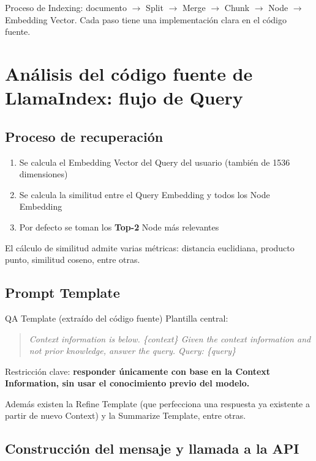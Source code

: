 \documentclass[a4paper]{article}
\begin{document}
Proceso de Indexing: documento $\rightarrow$ Split $\rightarrow$ Merge $\rightarrow$ Chunk $\rightarrow$ Node $\rightarrow$ Embedding Vector. Cada paso tiene una implementación clara en el código fuente.
\section{Análisis del código fuente de LlamaIndex: flujo de Query}

\subsection{Proceso de recuperación}

\begin{enumerate}
    \item Se calcula el Embedding Vector del Query del usuario (también de 1536 dimensiones)
    \item Se calcula la similitud entre el Query Embedding y todos los Node Embedding
    \item Por defecto se toman los \textbf{Top-2} Node más relevantes
\end{enumerate}

El cálculo de similitud admite varias métricas: distancia euclidiana, producto punto, similitud coseno, entre otras.

\subsection{Prompt Template}

\begin{importantbox}{QA Template (extraído del código fuente)}
Plantilla central:
\begin{quote}
\textit{Context information is below. \{context\} Given the context information and not prior knowledge, answer the query. Query: \{query\}}
\end{quote}
Restricción clave: \textbf{responder únicamente con base en la Context Information, sin usar el conocimiento previo del modelo.}
\end{importantbox}

Además existen la Refine Template (que perfecciona una respuesta ya existente a partir de nuevo Context) y la Summarize Template, entre otras.

\subsection{Construcción del mensaje y llamada a la API}
\end{document}

